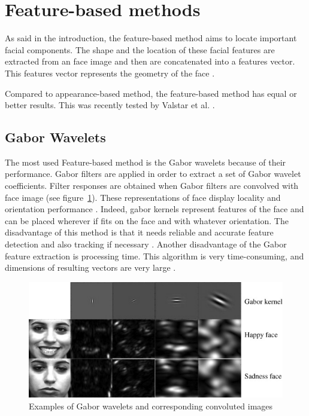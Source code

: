\section{Feature-based methods}

\noindent As said in the introduction, the feature-based method aims to locate important facial components. The shape and the location of these facial features are extracted from an face image and then are concatenated into a features vector. This features vector represents the geometry of the face \cite{SHA09}.
\newline

\noindent Compared to appearance-based method, the feature-based method has equal or better results. This was recently tested by Valstar et al. \cite{VAL05} \cite{VAL06}.
\newline

\subsection{Gabor Wavelets}

\vspace{\baselineskip}
\noindent The most used Feature-based method is the Gabor wavelets because of their performance. Gabor filters are applied in order to extract a set of Gabor wavelet coefficients. Filter responses are obtained when Gabor filters are convolved with face image (see figure~\ref{gabor_wavelets_example}). These representations of face display locality and orientation performance \cite{JEM09}. Indeed, gabor kernels represent features of the face and can be placed wherever if fits on the face and with whatever orientation. The disadvantage of this method is that it needs reliable and accurate feature detection and also tracking if necessary \cite{SHA09}. Another disadvantage of the Gabor feature extraction is processing time. This algorithm is very time-consuming, and dimensions of resulting vectors are very large \cite{PRA09}.
\newline

\begin{figure}[!h]
\begin{center}
\noindent \includegraphics[scale=1]{figures/gabor_wavelets_example} 
\newline
\caption{Examples of Gabor wavelets and corresponding convoluted images}
\label{gabor_wavelets_example}
\end{center} 
\end{figure}

